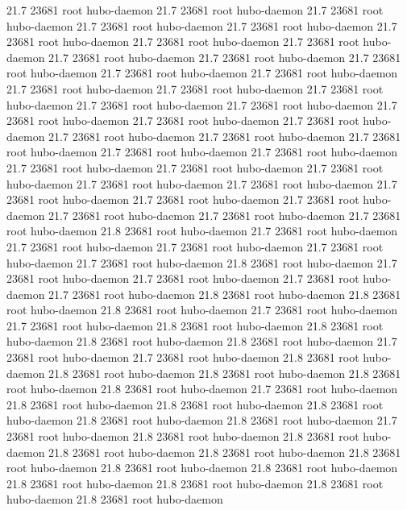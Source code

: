21.7 23681 root     hubo-daemon
21.7 23681 root     hubo-daemon
21.7 23681 root     hubo-daemon
21.7 23681 root     hubo-daemon
21.7 23681 root     hubo-daemon
21.7 23681 root     hubo-daemon
21.7 23681 root     hubo-daemon
21.7 23681 root     hubo-daemon
21.7 23681 root     hubo-daemon
21.7 23681 root     hubo-daemon
21.7 23681 root     hubo-daemon
21.7 23681 root     hubo-daemon
21.7 23681 root     hubo-daemon
21.7 23681 root     hubo-daemon
21.7 23681 root     hubo-daemon
21.7 23681 root     hubo-daemon
21.7 23681 root     hubo-daemon
21.7 23681 root     hubo-daemon
21.7 23681 root     hubo-daemon
21.7 23681 root     hubo-daemon
21.7 23681 root     hubo-daemon
21.7 23681 root     hubo-daemon
21.7 23681 root     hubo-daemon
21.7 23681 root     hubo-daemon
21.7 23681 root     hubo-daemon
21.7 23681 root     hubo-daemon
21.7 23681 root     hubo-daemon
21.7 23681 root     hubo-daemon
21.7 23681 root     hubo-daemon
21.7 23681 root     hubo-daemon
21.7 23681 root     hubo-daemon
21.7 23681 root     hubo-daemon
21.7 23681 root     hubo-daemon
21.7 23681 root     hubo-daemon
21.7 23681 root     hubo-daemon
21.7 23681 root     hubo-daemon
21.7 23681 root     hubo-daemon
21.8 23681 root     hubo-daemon
21.7 23681 root     hubo-daemon
21.7 23681 root     hubo-daemon
21.7 23681 root     hubo-daemon
21.7 23681 root     hubo-daemon
21.7 23681 root     hubo-daemon
21.8 23681 root     hubo-daemon
21.7 23681 root     hubo-daemon
21.7 23681 root     hubo-daemon
21.7 23681 root     hubo-daemon
21.7 23681 root     hubo-daemon
21.8 23681 root     hubo-daemon
21.8 23681 root     hubo-daemon
21.8 23681 root     hubo-daemon
21.7 23681 root     hubo-daemon
21.7 23681 root     hubo-daemon
21.8 23681 root     hubo-daemon
21.8 23681 root     hubo-daemon
21.8 23681 root     hubo-daemon
21.8 23681 root     hubo-daemon
21.7 23681 root     hubo-daemon
21.7 23681 root     hubo-daemon
21.8 23681 root     hubo-daemon
21.8 23681 root     hubo-daemon
21.8 23681 root     hubo-daemon
21.8 23681 root     hubo-daemon
21.8 23681 root     hubo-daemon
21.7 23681 root     hubo-daemon
21.8 23681 root     hubo-daemon
21.8 23681 root     hubo-daemon
21.8 23681 root     hubo-daemon
21.8 23681 root     hubo-daemon
21.8 23681 root     hubo-daemon
21.7 23681 root     hubo-daemon
21.8 23681 root     hubo-daemon
21.8 23681 root     hubo-daemon
21.8 23681 root     hubo-daemon
21.8 23681 root     hubo-daemon
21.8 23681 root     hubo-daemon
21.8 23681 root     hubo-daemon
21.8 23681 root     hubo-daemon
21.8 23681 root     hubo-daemon
21.8 23681 root     hubo-daemon
21.8 23681 root     hubo-daemon
21.8 23681 root     hubo-daemon
